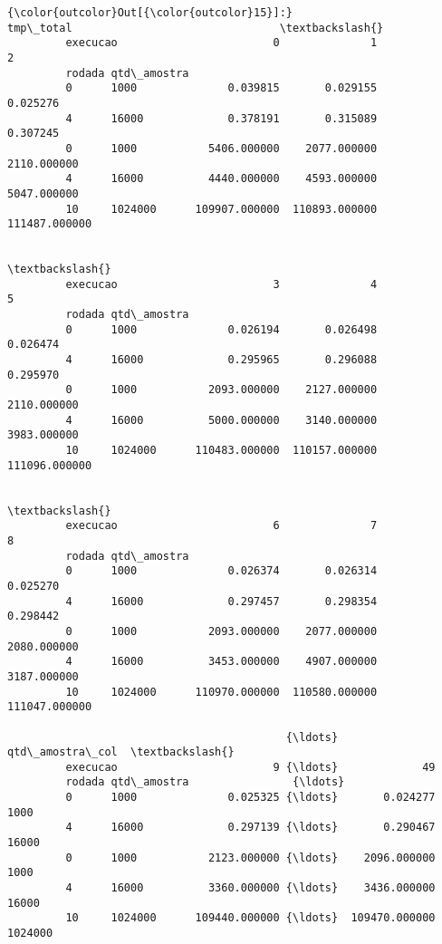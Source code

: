 \documentclass[11pt]{article}
\begin{document}
\begin{Verbatim}[commandchars=\\\{\}]
{\color{outcolor}Out[{\color{outcolor}15}]:}                         tmp\_total                                \textbackslash{}
         execucao                        0              1              2   
         rodada qtd\_amostra                                                
         0      1000              0.039815       0.029155       0.025276   
         4      16000             0.378191       0.315089       0.307245   
         0      1000           5406.000000    2077.000000    2110.000000   
         4      16000          4440.000000    4593.000000    5047.000000   
         10     1024000      109907.000000  110893.000000  111487.000000   
         
                                                                          \textbackslash{}
         execucao                        3              4              5   
         rodada qtd\_amostra                                                
         0      1000              0.026194       0.026498       0.026474   
         4      16000             0.295965       0.296088       0.295970   
         0      1000           2093.000000    2127.000000    2110.000000   
         4      16000          5000.000000    3140.000000    3983.000000   
         10     1024000      110483.000000  110157.000000  111096.000000   
         
                                                                          \textbackslash{}
         execucao                        6              7              8   
         rodada qtd\_amostra                                                
         0      1000              0.026374       0.026314       0.025270   
         4      16000             0.297457       0.298354       0.298442   
         0      1000           2093.000000    2077.000000    2080.000000   
         4      16000          3453.000000    4907.000000    3187.000000   
         10     1024000      110970.000000  110580.000000  111047.000000   
         
                                           {\ldots}                qtd\_amostra\_col  \textbackslash{}
         execucao                        9 {\ldots}             49                   
         rodada qtd\_amostra                {\ldots}                                  
         0      1000              0.025325 {\ldots}       0.024277            1000   
         4      16000             0.297139 {\ldots}       0.290467           16000   
         0      1000           2123.000000 {\ldots}    2096.000000            1000   
         4      16000          3360.000000 {\ldots}    3436.000000           16000   
         10     1024000      109440.000000 {\ldots}  109470.000000         1024000   
         

\end{Verbatim}
\end{document}
